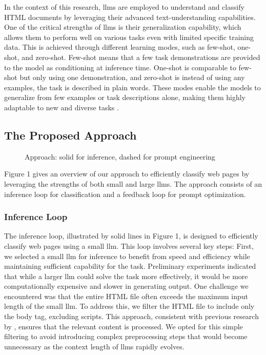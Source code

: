     In the context of this research, \acp{llm} are employed to understand and classify HTML documents by leveraging their advanced text-understanding capabilities. One of the critical strengths of \acp{llm} is their generalization capability, which allows them to perform well on various tasks even with limited specific training data. This is achieved through different learning modes, such as few-shot, one-shot, and zero-shot. Few-shot means that a few task demonstrations are provided to the model as conditioning at inference time. One-shot is comparable to few-shot but only using one demonstration, and zero-shot is instead of using any examples, the task is described in plain words. These modes enable the models to generalize from few examples or task descriptions alone, making them highly adaptable to new and diverse tasks \cite{brown_language_2020,touvron_llama_2023}.

\subsection{The Proposed Approach}
    \label{sec:approach:sub:proposed}

    \begin{figure}[htbp]
        \label{fig:gscan}
        \centering
        
        \caption{Approach: solid for inference, dashed for prompt engineering}
    \end{figure}

    Figure 1 gives an overview of our approach to efficiently classify web pages by leveraging the strengths of both small and large \acp{llm}. The approach consists of an inference loop for classification and a feedback loop for prompt optimization.

    \subsubsection{Inference Loop}
    \label{sec:approach:sub:proposed:sub:inference}

    The inference loop, illustrated by solid lines in Figure 1, is designed to efficiently classify web pages using a small \ac{llm}. This loop involves several key steps: First, we selected a small \ac{llm} for inference to benefit from speed and efficiency while maintaining sufficient capability for the task. Preliminary experiments indicated that while a larger \ac{llm} could solve the task more effectively, it would be more computationally expensive and slower in generating output. One challenge we encountered was that the entire HTML file often exceeds the maximum input length of the small \ac{llm}. To address this, we filter the HTML file to include only the body tag, excluding scripts. This approach, consistent with previous research by \cite{corazza_web_2021}, ensures that the relevant content is processed. We opted for this simple filtering to avoid introducing complex preprocessing steps that would become unnecessary as the context length of \acp{llm} rapidly evolves.
    
